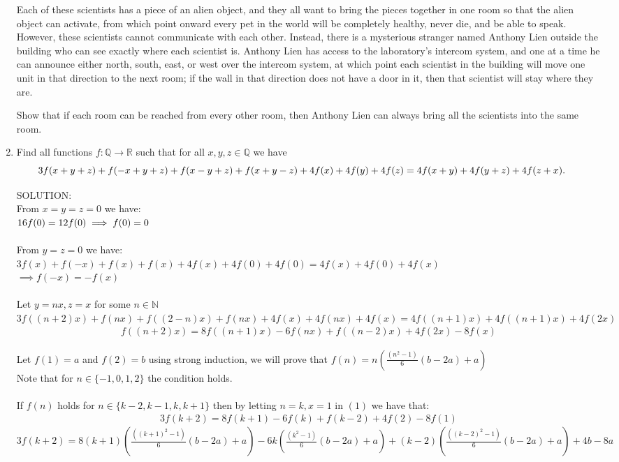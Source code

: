 \documentclass{article}
\begin{document}
\begin{enumerate}[1.]
Each of these scientists has a piece of an alien object, and they all want to bring the pieces together in one room so that the alien object can activate, from which point onward every pet in the world will be completely healthy, never die, and be able to speak.
However, these scientists cannot communicate with each other.
Instead, there is a mysterious stranger named Anthony Lien outside the building who can see exactly where each scientist is.
Anthony Lien has access to the laboratory's intercom system, and one at a time he can announce either north, south, east, or west over the intercom system, at which point each scientist in the building will move one unit in that direction to the next room; if the wall in that direction does not have a door in it, then that scientist will stay where they are.

Show that if each room can be reached from every other room, then Anthony Lien can always bring all the scientists into the same room.


\vfill
\item %
Find all functions $f : \mathbb{Q} \to \mathbb{R}$ such that for all $x, y, z \in \mathbb{Q}$ we have
\[ \mspace{-24mu} 3f(x+y+z) +f(-x+y+z) +f(x-y+z) +f(x+y-z) +4f(x) +4f(y) +4f(z) = 4f(x+y) +4f(y+z) +4f(z+x). \]

SOLUTION:\\

From $x=y=z=0$ we have:
\\$16f(0) = 12f(0) \\\implies f(0) = 0$
\\\\From $y=z=0$ we have:
\\$3f(x) + f(-x) + f(x) + f(x) + 4f(x) + 4f(0) + 4f(0) = 4f(x) + 4f(0) + 4f(x)$
\\$\implies f(-x) = -f(x)$
\\\\Let $y=nx, z=x$ for some $n \in \mathbb{N}$
\\$3f((n+2)x) + f(nx) + f((2-n)x) + f(nx) + 4f(x) + 4f(nx) + 4f(x) = 4f((n+1)x) + 4f((n+1)x) + 4f(2x)$
\begin{align}
f((n+2)x) = 8f((n+1)x) -6f(nx) + f((n-2)x) +4f(2x) - 8f(x)
\end{align}

Let $f(1) = a$ and $f(2) = b$ using strong induction, we will prove that $f(n) = n(\frac{(n^2-1)}{6}(b-2a)+a)$ 
\\Note that for $n\in \{-1,0,1,2\}$ the condition holds.
\\\\If $f(n)$ holds for $n\in\{k-2,k-1,k,k+1\}$ then by letting $n=k, x=1$ in $(1)$ we have that:
\begin{align}
3f(k+2) = 8f(k+1) -6f(k) + f(k-2) +4f(2) - 8f(1)\nonumber
\end{align}
$3f(k+2) = 8(k+1)(\frac{((k+1)^2-1)}{6}(b-2a)+a) - 6k(\frac{(k^2-1)}{6}(b-2a)+a) + (k-2)(\frac{((k-2)^2-1)}{6}(b-2a)+a) + 4b - 8a$\\


\end{enumerate}
\end{document}
